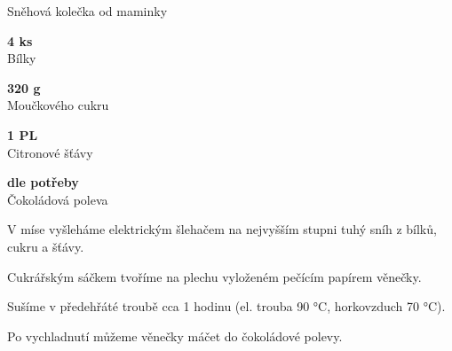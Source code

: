 \documentclass[11pt,a4paper]{article}
\begin{document}
\begin{recipe}[LightSkyBlue]{Sněhová kolečka od maminky}
    \begin{ingredients}
        \item \parbox[t]{\linewidth}{\raggedright \piece \textbf{4 ks}\\ Bílky}
        \item \parbox[t]{\linewidth}{\raggedright \weight \textbf{320 g}\\ Moučkového cukru}
        \item \parbox[t]{\linewidth}{\raggedright \spoon \textbf{1 PL}\\ Citronové šťávy}
        \item \parbox[t]{\linewidth}{\raggedright \indefinite \textbf{dle potřeby}\\ Čokoládová poleva}
    \end{ingredients}
    \begin{steps}
        \item V míse vyšleháme elektrickým šlehačem na nejvyšším stupni tuhý sníh z bílků, cukru a šťávy.
        \item Cukrářským sáčkem tvoříme na plechu vyloženém pečícím papírem věnečky.
        \item Sušíme v předehřáté troubě cca 1 hodinu (el. trouba 90 °C, horkovzduch 70 °C).
        \item Po vychladnutí můžeme věnečky máčet do čokoládové polevy.
    \end{steps}
\end{recipe}
\end{document}
